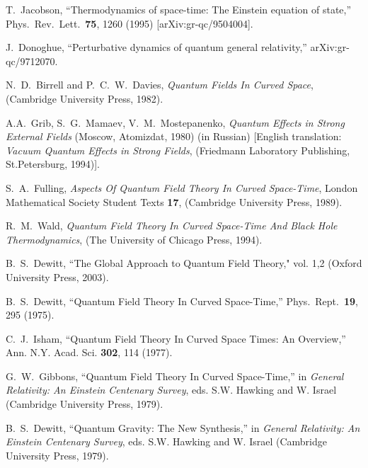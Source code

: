 \documentclass[12pt]{article}
\begin{document}
\begin{thebibliography}{99}

T.~Jacobson,
``Thermodynamics of space-time: The Einstein equation of state,''
Phys.\ Rev.\ Lett.\  {\bf 75}, 1260 (1995)
[arXiv:gr-qc/9504004].

J.~Donoghue,
``Perturbative dynamics of quantum general relativity,''
arXiv:gr-qc/9712070.

N.~D.~Birrell and P.~C.~W.~Davies,
{\it Quantum Fields In Curved Space},
(Cambridge University Press, 1982).

A.A.~Grib, S.~G.~Mamaev, V.~M.~Mostepanenko,
{\it Quantum Effects in Strong External Fields} (Moscow, Atomizdat, 1980)  (in Russian) [English translation: {\it Vacuum Quantum Effects in Strong Fields}, (Friedmann Laboratory Publishing, St.Petersburg, 1994)].

S.~A.~Fulling,
{\it Aspects Of Quantum Field Theory In Curved Space-Time},
London Mathematical Society Student Texts {\bf 17}, 
(Cambridge University Press, 1989).

R.~M.~Wald,
{\it Quantum Field Theory In Curved Space-Time And Black Hole
Thermodynamics}, (The University of Chicago Press, 1994).

B.~S.~Dewitt, ``The Global Approach to Quantum Field Theory," vol. 1,2 (Oxford University Press, 2003).

B.~S.~Dewitt,
``Quantum Field Theory In Curved Space-Time,''
Phys.\ Rept.\  {\bf 19}, 295 (1975).

C.~J.~Isham,
``Quantum Field Theory In Curved Space Times: An Overview,''
Ann. N.Y. Acad. Sci. {\bf 302}, 114 (1977).

G.~W.~Gibbons,
``Quantum Field Theory In Curved Space-Time,''
in {\it General Relativity: An Einstein Centenary Survey},
eds. S.W. Hawking and W. Israel (Cambridge University Press, 1979).

B.~S.~Dewitt,
``Quantum Gravity: The New Synthesis,'' in {\it General Relativity: An Einstein Centenary Survey},
eds. S.W. Hawking and W. Israel (Cambridge University Press, 1979).


\end{thebibliography}
\end{document}
